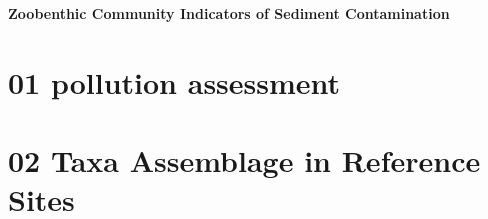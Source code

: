 \documentclass[12pt, oneside]{report}
\begin{document}

\begin{titlepage}
\thispagestyle{empty} %
\centering
\vspace*{2cm}

{\LARGE\bfseries Zoobenthic Community Indicators of Sediment Contamination\par}
\vspace{1.2cm}

\end{titlepage}






\clearpage
{} %
\setcounter{page}{1}
\tableofcontents

\clearpage
{} %
\setcounter{page}{1}   %



\section{01 pollution assessment}











\section{02 Taxa Assemblage in Reference Sites}


\end{document}
